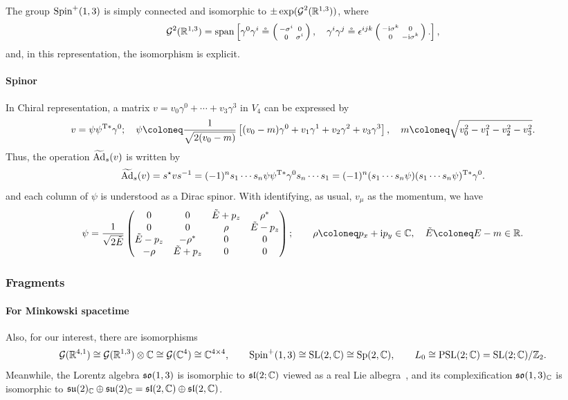 \documentclass[CheatSheet]{subfiles}
\begin{document}
The group $\operatorname{\mathrm{Spin}}^+(1,3)$ is simply connected and isomorphic to $\pm\exp(\operatorname{\mathcal{G}}^2({\mathbb{R}}^{1,3}))$, where
\begin{equation}
  \operatorname{\mathcal{G}}^2({\mathbb{R}}^{1,3})=\mathop{\mathrm{span}}\left[
    \gamma^0\gamma^i\circeq\left(\begin{smallmatrix}-\sigma^i&0\\0&\sigma^i\end{smallmatrix}\right),\quad
    \gamma^i\gamma^j\circeq\epsilon^{ijk}\left(\begin{smallmatrix}-{\mathrm{i}}\sigma^k&0\\0&-{\mathrm{i}}\sigma^k\end{smallmatrix}\right).
   \right],
\end{equation}
and, in this representation, the isomorphism  is explicit.

\paragraph{Spinor} In Chiral representation, a matrix $v=v_0\gamma^0+\cdots+v_3\gamma^3$ in $V_4$ can be expressed by
\[
 v = \psi\psi^{\TT*}\gamma^0;\quad \psi\deq
 \frac{1}{\sqrt{2(v_0-m)}}
 \left[(v_0 - m)\gamma^0 + v_1\gamma^1 + v_2\gamma^2 + v_3\gamma^3\right],\quad m\deq\sqrt{v_0^2-v_1^2-v_2^2-v_3^2}.
\]
Thus, the operation $\operatorname{\widetilde{\mathrm{Ad}}}_s(v)$ is written by
\[
\operatorname{\widetilde{\mathrm{Ad}}}_s(v)=s^\star v s^{-1}
=(-1)^ns_1\cdots s_n \psi\psi^{{\mathrm{T}}*}\gamma^0 s_n\cdots s_1
=(-1)^n(s_1\cdots s_n \psi)(s_1\cdots s_n\psi)^{{\mathrm{T}}*}\gamma^0.
\]
and each column of $\psi$ is understood as a Dirac spinor.
With identifying, as usual, $v_\mu$ as the momentum, we have
\[
\psi= \frac{1}{\sqrt{2\tilde E}}\pmat{
  0 & 0 & \tilde E+p_z & \rho^* \\
  0 & 0 & \rho & \tilde E-p_z \\
  \tilde E-p_z & -\rho^* & 0 & 0 \\
  -\rho & \tilde E+p_z & 0 & 0 \\
};\qquad \rho\deq p_x+\ii p_y\in\CC,\quad \tilde E\deq E-m\in\RR.
\]




\subsubsection{Fragments}
\paragraph{For Minkowski spacetime}
Also, for our interest, there are isomorphisms~\cite{RauschdeTraubenberg:2005aa,Yamaguchi:spinor}
\begin{equation}
  \operatorname{\mathcal{G}}({\mathbb{R}}^{4,1})\cong \operatorname{\mathcal{G}}({\mathbb{R}}^{1,3})\otimes {\mathbb{C}} \cong \operatorname{\mathcal{G}}({\mathbb{C}}^4)\cong{\mathbb{C}}^{4\times4},\qquad
  \operatorname{\mathrm{Spin}}^+(1,3)\cong\operatorname{\mathrm SL}(2,{\mathbb{C}})\cong\operatorname{\mathrm Sp}(2,{\mathbb{C}}),\qquad
  L_0\cong\mathop{\mathrm{PSL}}(2;{\mathbb{C}})=\operatorname{\mathrm SL}(2;{\mathbb{C}})/{\mathbb{Z}}_2.
\end{equation}
Meanwhile, the Lorentz algebra $\operatorname{\mathfrak{so}}(1,3)$ is isomorphic to $\operatorname{\mathfrak{sl}}(2;\mathbb C)$ viewed as a real Lie albegra~\cite[\S7.8]{Hall2015},
and its complexification
$\operatorname{\mathfrak{so}}(1,3)_{\mathbb C}$ is isomorphic to $
\operatorname{\mathfrak{su}}(2)_{\mathbb C}\oplus\operatorname{\mathfrak{su}}(2)_{\mathbb C}
=\operatorname{\mathfrak{sl}}(2,\mathbb C)\oplus\operatorname{\mathfrak{sl}}(2,\mathbb C)$.

\end{document}
